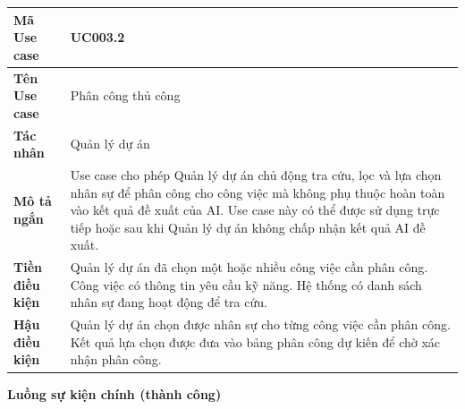 \documentclass[../DoAn.tex]{subfiles}
\begin{document}
{\ucTableText
\begin{longtable}{|>{\columncolor{ucLabelBg}\bfseries}p{}|p{}|}
\hline
Mã Use case & UC003.2 \\ \hline
Tên Use case & Phân công thủ công \\ \hline
Tác nhân & Quản lý dự án \\ \hline
Mô tả ngắn & Use case cho phép Quản lý dự án chủ động tra cứu, lọc và lựa chọn nhân sự để phân công cho công việc mà không phụ thuộc hoàn toàn vào kết quả đề xuất của AI. Use case này có thể được sử dụng trực tiếp hoặc sau khi Quản lý dự án không chấp nhận kết quả AI đề xuất. \\ \hline
Tiền điều kiện & Quản lý dự án đã chọn một hoặc nhiều công việc cần phân công. Công việc có thông tin yêu cầu kỹ năng. Hệ thống có danh sách nhân sự đang hoạt động để tra cứu. \\ \hline
Hậu điều kiện & Quản lý dự án chọn được nhân sự cho từng công việc cần phân công. Kết quả lựa chọn được đưa vào bảng phân công dự kiến để chờ xác nhận phân công. \\ \hline
\end{longtable}
}

\textbf{Luồng sự kiện chính (thành công)}
\end{document}
